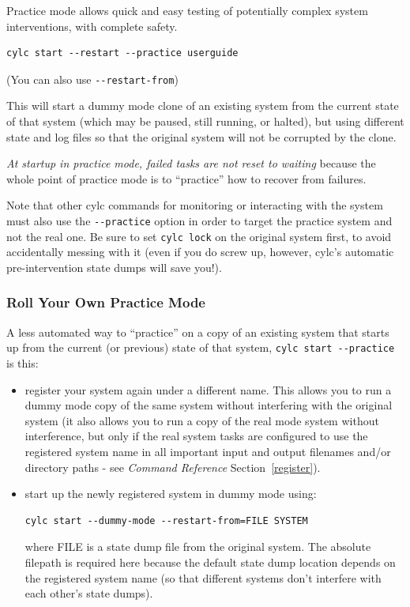 \documentclass[11pt,a4paper]{article}
\begin{document}
Practice mode allows quick and easy testing of potentially complex
system interventions, with complete safety.

\begin{lstlisting}
cylc start --restart --practice userguide
\end{lstlisting}
(You can also use \lstinline=--restart-from=)

This will start a dummy mode clone of an existing system from the
current state of that system (which may be paused, still running, or
halted), but using different state and log files so that the original
system will not be corrupted by the clone.

{\em At startup in practice mode, failed tasks are not reset to waiting}
because the whole point of practice mode is to ``practice'' how to
recover from failures.

Note that other cylc commands for monitoring or interacting with the
system must also use the \lstinline=--practice= option in order to
target the practice system and not the real one. Be sure to set
\lstinline=cylc lock= on the original system first, to avoid
accidentally messing with it (even if you do screw up, however, cylc's
automatic pre-intervention state dumps will save you!).


\subsubsection{Roll Your Own Practice Mode}

A less automated way to ``practice'' on a copy of an existing system
that starts up from the current (or previous) state of that system, 
\lstinline=cylc start --practice= is this:

\begin{itemize}
    \item register your system again under a different name. This allows
        you to run a dummy mode copy of the same system without
        interfering with the original system (it also allows you to run
        a copy of the real mode system without interference, but only if
        the real system tasks are configured to use the registered
        system name in all important input and output filenames and/or
        directory paths - see {\em Command Reference} Section~\ref{register}).

    \item start up the newly registered system in dummy mode using:
        \begin{lstlisting}
cylc start --dummy-mode --restart-from=FILE SYSTEM
        \end{lstlisting}
        where FILE is a state dump file from the original system. The
        absolute filepath is required here because the default state
        dump location depends on the registered system name (so that
        different systems don't interfere with each other's state
        dumps).

\end{itemize}
\end{document}
